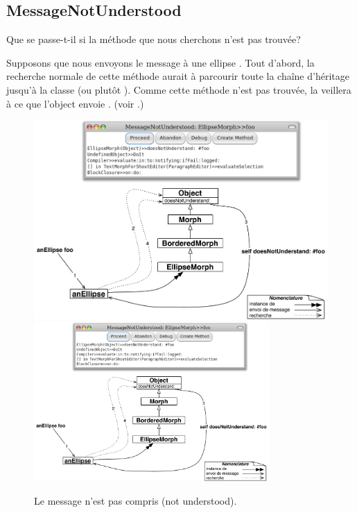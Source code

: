 \documentclass[a4paper,10pt,twoside]{book}
\begin{document}
\subsection{MessageNotUnderstood}

Que se passe-t-il si la méthode que nous cherchons n'est pas trouvée?

Supposons que nous envoyons le message  à une ellipse .
Tout d'abord, la recherche normale de cette méthode aurait à parcourir
toute la chaîne d'héritage jusqu'à la classe  (ou
plutôt ).
Comme cette méthode n'est pas trouvée, la  veillera
à ce que l'object envoie .
(voir .)

\begin{figure}[htb]
\begin{center}
\ifluluelse
	{\includegraphics[width=\textwidth]{fooNotFound}}
	{\includegraphics[width=0.8\textwidth]{fooNotFound}}
\caption{Le message  n'est pas compris (not understood).}
\end{center}
\end{figure}
\end{document}
